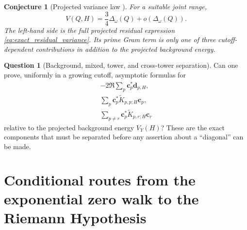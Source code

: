 \documentclass[11pt]{amsart}
\numberwithin{equation}{section}
\theoremstyle{plain}
\newtheorem{conjecture}[theorem]{Conjecture}
\theoremstyle{definition}
\newtheorem{question}[theorem]{Question}
\theoremstyle{remark}
\newcommand{\1}{\mathbf{1}}
\begin{document}
\begin{conjecture}[Projected variance law {\normalfont[Conjecture]}]
\label{conj:projected_variance_law}
For a suitable joint range,
\begin{equation}
V(Q,H)
=
\frac34\Delta_\omega(Q)
+
o\left(\Delta_\omega(Q)\right).
\label{eq:projected_variance_law}
\end{equation}
The left-hand side is the full projected residual expression
\eqref{eq:exact_residual_variance}.  Its prime Gram term is only one of
three cutoff-dependent contributions in addition to the projected
background energy.
\end{conjecture}

\begin{question}[Background, mixed, tower, and cross-tower separation]
\label{question:tower_cross_tower_separation}
Can one prove, uniformly in a growing cutoff, asymptotic formulas for
\begin{align}
-2\Re\sum_p\mathbf c_p^\ast\mathbf d_{p,H},
\label{eq:mixed_sum_target}
\\
\sum_p\mathbf c_p^\ast\widetilde K_{p,p;H}\mathbf c_p,
\label{eq:tower_sum_target}
\\
\sum_{p\neq r}\mathbf c_p^\ast\widetilde K_{p,r;H}\mathbf c_r
\label{eq:cross_tower_sum_target}
\end{align}
relative to the projected background energy $V_Y(H)$?  These are the exact
components that must be separated before any assertion about a
``diagonal'' can be made.
\end{question}




\section{Conditional routes from the exponential zero walk to the Riemann Hypothesis}
\label{sec:routes_to_RH}
\end{document}

